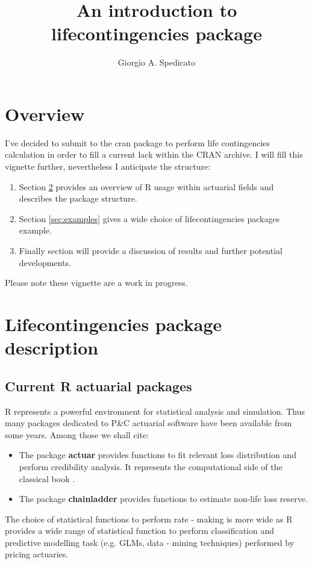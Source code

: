 \documentclass[a4paper]{article}
\begin{document}
\title{An introduction to lifecontingencies package}
\author{Giorgio A. Spedicato}

\maketitle

\section{Overview}
I've decided to submit to the cran package to perform life contingencies calculation in order to fill a current
lack within the CRAN archive. I will fill this  vignette further, nevertheless I anticipate the structure:

\begin{enumerate}
	\item Section \ref{sec:package} provides an overview of R usage within actuarial 
	fields and describes the package structure.
	\item Section \ref{sec:examples} gives a wide choice of lifecontingencies packages example.
	\item Finally section \label{sec:discussion} will provide a discussion of results and further potential
	developments.
\end{enumerate}

Please note these vignette are a work in progress.

\section{Lifecontingencies package description} \label{sec:package}

\subsection{Current R actuarial packages}
R \cite{rSoftware} represents a powerful enviromnent for statistical analysis and simulation. Thus many packages 
dedicated to P\&C actuarial software have been available from some years. Among those we shall cite:
\begin{itemize}
	\item The package \textbf{actuar} \cite{Dutang2008} provides functions to fit relevant loss distribution and perform credibility 
	analysis. It represents the computational side of the classical book \cite{lossDistributions}.
	\item The package \textbf{chainladder} \cite{chainLadder} provides functions to estimate non-life loss reserve.
\end{itemize}
The choice of statistical functions to perform rate - making is more wide as R provides a wide range of statistical function to 
perform classification and predictive modelling task (e.g. GLMs, data - mining techniques) performed by pricing actuaries.\\
\end{document}

